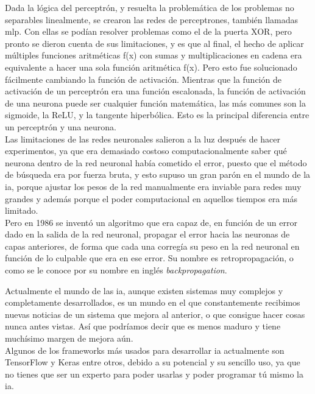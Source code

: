 Dada la lógica del perceptrón, y resuelta la problemática de los problemas no separables linealmente, se crearon las redes de perceptrones, también llamadas \gls{mlp}. Con ellas se podían resolver problemas como el de la puerta XOR, pero pronto se dieron cuenta de sus limitaciones, y es que al final, el hecho de aplicar múltiples funciones aritméticas f(x) con sumas y multiplicaciones en cadena era equivalente a hacer una sola función aritmética f(x). Pero esto fue solucionado fácilmente cambiando la función de activación. Mientras que la función de activación de un perceptrón era una función escalonada, la función de activación de una neurona puede ser cualquier función matemática, las más comunes son la sigmoide, la ReLU, y la tangente hiperbólica. Esto es la principal diferencia entre un perceptrón y una neurona.
\\
Las limitaciones de las redes neuronales salieron a la luz después de hacer experimentos, ya que era demasiado costoso computacionalmente saber qué neurona dentro de la red neuronal había cometido el error, puesto que el método de búsqueda era por fuerza bruta, y esto supuso un gran parón en el mundo de la \gls{ia}, porque ajustar los pesos de la red manualmente era inviable para redes muy grandes y además porque el poder computacional en aquellos tiempos era más limitado.
\\
Pero en 1986 se inventó un algoritmo que era capaz de, en función de un error dado en la salida de la red neuronal, propagar el error hacia las neuronas de capas anteriores, de forma que cada una corregía su peso en la red neuronal en función de lo culpable que era en ese error. Su nombre es retropropagación, o como se le conoce por su nombre en inglés \textit{backpropagation}. 

Actualmente el mundo de las \gls{ia}, aunque existen sistemas muy complejos y completamente desarrollados, es un mundo en el que constantemente recibimos nuevas noticias de un sistema que mejora al anterior, o que consigue hacer cosas nunca antes vistas. Así que podríamos decir que es menos maduro y tiene muchísimo margen de mejora aún.
\\
Algunos de los frameworks más usados para desarrollar \gls{ia} actualmente son TensorFlow y Keras entre otros, debido a su potencial y su sencillo uso, ya que no tienes que ser un experto para poder usarlas y poder programar tú mismo la \gls{ia}.

